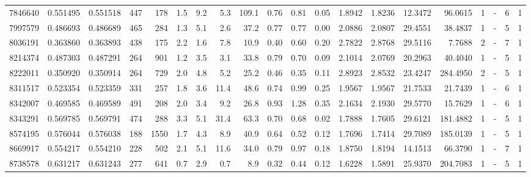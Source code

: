 \begin{center}
\begin{tabular}{rccrrccrrrrrrrrrrlrr}
   7846640 & 0.551495 & 0.551518 &  447 &  178 &      1.5 &      9.2 &     5.3 &   109.1 &   0.76 &   0.81 &       0.05 &  1.8942 &  1.8236 &   12.3472 &   96.0615 &       1 &             - &        6 &         1 \\
   7997579 & 0.486693 & 0.486689 &  465 &  284 &      1.3 &      5.1 &     2.6 &    37.2 &   0.77 &   0.77 &       0.00 &  2.0886 &  2.0807 &   29.4551 &   38.4837 &       1 &             - &        5 &         1 \\
   8036191 & 0.363860 & 0.363893 &  438 &  175 &      2.2 &      1.6 &     7.8 &    10.9 &   0.40 &   0.60 &       0.20 &  2.7822 &  2.8768 &   29.5116 &    7.7688 &       2 &             - &        7 &         1 \\
   8214374 & 0.487303 & 0.487291 &  264 &  901 &      1.2 &      3.5 &     3.1 &    33.8 &   0.79 &   0.70 &       0.09 &  2.1014 &  2.0769 &   20.2963 &   40.4040 &       1 &             - &        5 &         1 \\
   8222011 & 0.350920 & 0.350914 &  264 &  729 &      2.0 &      4.8 &     5.2 &    25.2 &   0.46 &   0.35 &       0.11 &  2.8923 &  2.8532 &   23.4247 &  284.4950 &       2 &             - &        5 &         1 \\
   8311517 & 0.523354 & 0.523359 &  331 &  257 &      1.8 &      3.6 &    11.4 &    48.6 &   0.74 &   0.99 &       0.25 &  1.9567 &  1.9567 &   21.7533 &   21.7439 &       1 &             - &        6 &         1 \\
   8342007 & 0.469585 & 0.469589 &  491 &  208 &      2.0 &      3.4 &     9.2 &    26.8 &   0.93 &   1.28 &       0.35 &  2.1634 &  2.1930 &   29.5770 &   15.7629 &       1 &             - &        6 &         1 \\
   8343291 & 0.569785 & 0.569791 &  474 &  288 &      3.3 &      5.1 &    31.4 &    63.3 &   0.70 &   0.68 &       0.02 &  1.7888 &  1.7605 &   29.6121 &  181.4882 &       1 &             - &        5 &         1 \\
   8574195 & 0.576044 & 0.576038 &  188 & 1550 &      1.7 &      4.3 &     8.9 &    40.9 &   0.64 &   0.52 &       0.12 &  1.7696 &  1.7414 &   29.7089 &  185.0139 &       1 &             - &        5 &         1 \\
   8669917 & 0.554217 & 0.554210 &  228 &  502 &      2.1 &      5.1 &    11.6 &    34.0 &   0.79 &   0.97 &       0.18 &  1.8750 &  1.8194 &   14.1513 &   66.3790 &       1 &             - &        7 &         1 \\
   8738578 & 0.631217 & 0.631243 &  277 &  641 &      0.7 &      2.9 &     0.7 &     8.9 &   0.32 &   0.44 &       0.12 &  1.6228 &  1.5891 &   25.9370 &  204.7083 &       1 &             - &        5 &         1 \\

\end{tabular}
\end{center}
